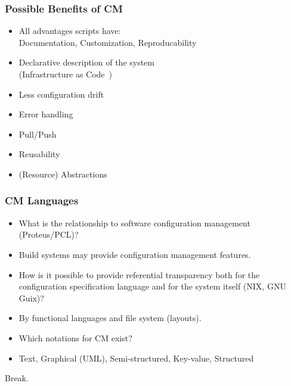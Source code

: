 \begin{frame}
	\frametitle{Possible Benefits of CM}

	\pause

	\begin{itemize} %
	\item All advantages scripts have: \\
		Documentation, Customization, Reproducability
	\item Declarative description of the system \\
		(Infrastructure as Code~\cite{waldemar2013testing})
	\item Less configuration drift
	\item Error handling
	\item Pull/Push
	\item Reusability
	\item (Resource) Abstractions
	\end{itemize}
\end{frame}

\begin{frame}
	\frametitle{CM Languages}

	\begin{itemize}[<+-| alert@+>]
	\item What is the relationship to software configuration management (Proteus/PCL)?
	\item[] Build systems may provide configuration management features.
	\item How is it possible to provide referential transparency both for the configuration specification language and for the system itself (NIX, GNU Guix)?
	\item[] By functional languages and file system (layouts).
	\item Which notations for CM exist?
	\item[] Text,  Graphical (UML), Semi-structured, Key-value, Structured
	\end{itemize}
\end{frame}

\begin{assignment}
	\begin{task}
	Break.
	\end{task}
\end{assignment}

